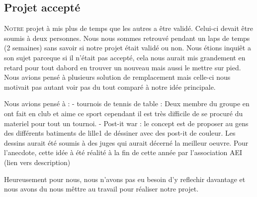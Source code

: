 \subsection{Projet accepté}%
\label{sub:projet_accepte}

\lettrine{N}{otre} projet à mis plus de temps que les autres a être
validé.  Celui-ci devait être soumis à deux personnes. Nous nous sommes
retrouvé pendant un laps de temps (2 semaines) sans savoir si notre
projet était validé ou non. Nous étions inquiêt a son sujet parceque si
il n'était pas accepté, cela nous aurait mis grandement en retard pour
tout dabord en trouver un nouveau mais aussi le mettre sur pied. Nous
avions pensé à plusieurs solution de remplacement mais celle-ci nous
motivait pas autant voir pas du tout comparé à notre idée principale.

Nous avions pensé à :
  - tournois de tennis de table : Deux membre du groupe en ont fait
en club et aime ce sport cependant il est très difficile de se procuré
du materiel pour tout un tournoi.
  - Post-it war : le concept est de proposer au gens des différents
batiments de lille1 de déssiner avec des post-it de couleur. Les dessins
aurait été soumis à des juges qui aurait décerné la meilleur oeuvre.
Pour l'anecdote, cette idée à été réalité à la fin de cette année par
l'association AEI (lien vers description)

Heureusement pour nous, nous n'avons pas eu besoin d'y reflechir
davantage et nous avons du nous mêttre au travail pour réaliser notre
projet.

